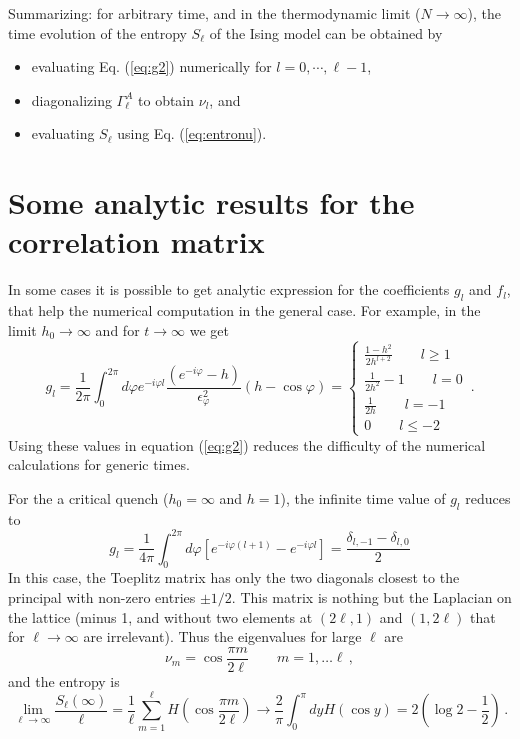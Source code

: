 \documentclass[12pt,preprint,tighten,eqsecnum,aps,floats,psfig,epsfig,amsmath,onecolumn]{revtex4-1}
\def\be{\begin{equation}}
\def\ee{\end{equation}}
\def\e{\epsilon}
\def\p{\varphi}
\begin{document}
{Summarizing: for arbitrary time, and in the thermodynamic limit 
($N\rightarrow \infty$), the time evolution of the entropy $S_\ell$ of the
Ising model can be obtained by 
\begin{itemize}
\item evaluating Eq. (\ref{eq:g2}) numerically for $l=0,\cdots, \ell-1$, 
\item diagonalizing $\Gamma_\ell^A$ to obtain $\nu_l$, and 
\item evaluating $S_\ell$ using Eq. (\ref{eq:entronu}).
\end{itemize}


\section{Some analytic results for the correlation matrix}
\label{appb}

In some cases it is possible to get analytic expression for the coefficients 
$g_l$ and $f_l$, that help the numerical computation in the general case.
For example, in the limit $h_0\rightarrow\infty$ and for $t\rightarrow\infty$
we get
\be
g_l=\frac{1}{2\pi} \int_0^{2\pi} d\p e^{-i\p l} 
\frac{(e^{-i\p}-h)}{\e_\p^2} (h-\cos\p)=
\begin{cases}
\frac{1-h^2}{2h^{l+2}}\qquad l\geq1\\
\frac{1}{2h^2}-1\qquad l=0\\
\frac{1}{2h}\qquad l=-1\\
0\qquad l\leq-2
\end{cases}\,.
\label{glh0infinity}
\ee
Using these values in equation (\ref{eq:g2}) reduces the difficulty of the 
numerical calculations for generic times.
 
For the a critical quench ($h_0=\infty$ and $h=1$), the infinite time
value of $g_l$ reduces to
\be
g_l=\frac{1}{4\pi}\int_0^{2\pi} d\p [e^{-i\p (l+1)}-e^{-i\p l}]=
\frac{\delta_{l,-1}-\delta_{l,0}}{2}
\ee
In this case, the Toeplitz matrix has only the two diagonals closest to the 
principal with non-zero entries $\pm1/2$.
This matrix is nothing but the Laplacian on the lattice (minus 1, and without
two elements at $(2\ell,1)$ and $(1,2\ell)$ that for $\ell\rightarrow\infty$ are 
irrelevant). Thus the eigenvalues for large $\ell$ are 
\be
\nu_m=\cos\frac{\pi m}{2\ell}\qquad m=1,\dots \ell\,,
\ee
and the entropy is
\be
\lim_{\ell\rightarrow\infty}\frac{S_\ell(\infty)}{\ell}=
\frac{1}{\ell}\sum_{m=1}^\ell H(\cos\frac{\pi m}{2\ell})\rightarrow
\frac{2}{\pi}\int_0^\pi d y H(\cos y)=
 2\left(\log2-\frac{1}{2}\right) \,.
\ee

}
\end{document}
